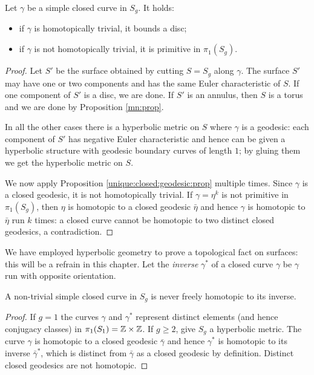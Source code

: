 \begin{prop} \label{disco:prop}
Let $\gamma$ be a simple closed curve in $S_g$. It holds:
\begin{itemize}
\item if $\gamma$ is homotopically trivial, it bounds a disc;
\item if $\gamma$ is not homotopically trivial, it is primitive in $\pi_1(S_g)$.
\end{itemize}
\end{prop}
\begin{proof}
Let $S'$ be the surface obtained by cutting $S=S_g$ along $\gamma$. The surface $S'$ may have one or two components and has the same Euler characteristic of $S$. If one component of $S'$ is a disc, we are done. If $S'$ is an annulus, then $S$ is a torus and we are done by Proposition \ref{mn:prop}.

In all the other cases there is a hyperbolic metric on $S$ where $\gamma$ is a geodesic: each component of $S'$ has negative Euler characteristic and hence can be given a hyperbolic structure with geodesic boundary curves of length $1$; by gluing them we get the hyperbolic metric on $S$. 

We now apply Proposition \ref{unique:closed:geodesic:prop} multiple times. Since $\gamma$ is a closed geodesic, it is not homotopically trivial. If $\gamma = \eta^k$ is not primitive in $\pi_1(S_g)$, then $\eta$ is homotopic to a closed geodesic $\bar\eta$ and hence $\gamma$ is homotopic to $\bar\eta$ run $k$ times: a closed curve cannot be homotopic to two distinct closed geodesics, a contradiction.
\end{proof}

We have employed hyperbolic geometry to prove a topological fact on surfaces: this will be a refrain in this chapter. Let the \emph{inverse} $\gamma^*$ of a closed curve $\gamma$ be $\gamma$ run with opposite orientation.

\begin{prop} \label{no:inverso:prop}
A non-trivial simple closed curve in $S_g$ is never freely homotopic to its inverse. 
\end{prop}
\begin{proof}
If $g=1$ the curves $\gamma$ and $\gamma^*$ represent distinct elements (and hence conjugacy classes) in $\pi_1(S_1) =  \mathbb{Z} \times \mathbb{Z}$. If $g\geqslant 2$, give $S_g$ a hyperbolic metric. The curve $\gamma$ is homotopic to a closed geodesic $\bar\gamma$ and hence $\gamma^*$ is homotopic to its inverse $\bar\gamma^*$, which is distinct from $\bar\gamma$ as a closed geodesic by definition. Distinct closed geodesics are not homotopic.
\end{proof}

